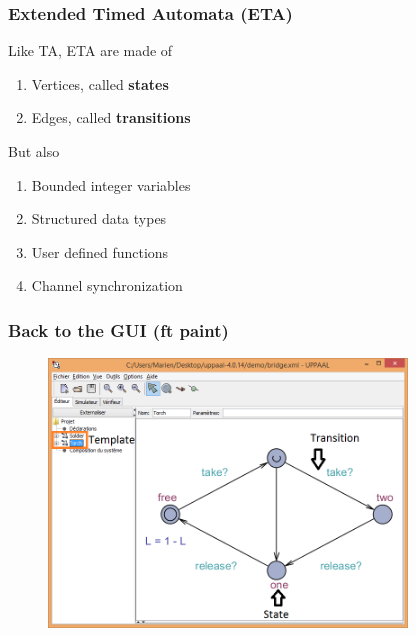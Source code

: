 \documentclass{beamer}
\begin{document}
\begin{frame}
	\frametitle{Extended Timed Automata (ETA)}
	\begin{block}{Like TA, ETA are made of}
		\begin{enumerate}
			\item Vertices, called \textbf{states}
			\item Edges, called \textbf{transitions}
		\end{enumerate}
	\end{block}
	
	\begin{block}{But also}
		\begin{enumerate}
			\item Bounded integer variables
			\item Structured data types
			\item User defined functions
			\item Channel synchronization
		\end{enumerate}
	\end{block}
	
\end{frame}

\begin{frame}
	\frametitle{Back to the GUI (ft paint)}
	\begin{figure}
    	\centering
    	\includegraphics[width = 0.85\textwidth]{uppaal_eta.png}
  	\end{figure}
\end{frame}
\end{document}
